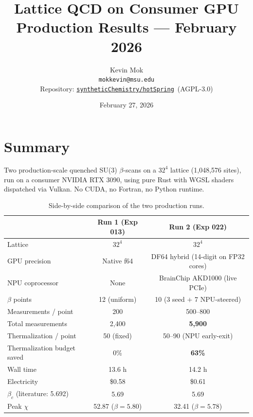 \documentclass[11pt,a4paper]{article}
\newcommand{\schi}{\chi}
\newcommand{\btc}{\beta_c}
\newcommand{\repo}{\href{https://github.com/syntheticChemistry/hotSpring}%
                        {\texttt{syntheticChemistry/hotSpring}}}
\begin{document}
\title{\textbf{Lattice QCD on Consumer GPU}\\[4pt]
       \large Production Results --- February 2026}
\author{Kevin Mok\\
        \small\texttt{mokkevin@msu.edu}\\[4pt]
        \small Repository: \repo\ (AGPL-3.0)}
\date{February 27, 2026}
\maketitle
\tableofcontents
\newpage

\section*{Summary}

Two production-scale quenched SU(3) $\beta$-scans on a $32^4$ lattice
(1,048,576 sites), run on a consumer NVIDIA RTX 3090, using pure Rust with
WGSL shaders dispatched via Vulkan.  No CUDA, no Fortran, no Python runtime.

\begin{table}[H]
\centering
\caption{Side-by-side comparison of the two production runs.}
\label{tab:summary}
\renewcommand{\arraystretch}{1.3}
\begin{tabular}{lcc}
\toprule
 & \textbf{Run 1 (Exp 013)} & \textbf{Run 2 (Exp 022)} \\
\midrule
Lattice                      & $32^4$       & $32^4$ \\
GPU precision                & Native f64   & DF64 hybrid (14-digit on FP32 cores) \\
NPU coprocessor              & None         & BrainChip AKD1000 (live PCIe) \\
$\beta$ points               & 12 (uniform) & 10 (3 seed $+$ 7 NPU-steered) \\
Measurements / point         & 200          & 500--800 \\
Total measurements           & 2,400        & \textbf{5,900} \\
Thermalization / point       & 50 (fixed)   & 50--90 (NPU early-exit) \\
Thermalization budget saved  & 0\%          & \textbf{63\%} \\
Wall time                    & 13.6 h       & 14.2 h \\
Electricity                  & \$0.58       & \$0.61 \\
$\btc$ (literature: 5.692)   & 5.69         & 5.69 \\
Peak $\schi$                 & 52.87 ($\beta=5.80$) & 32.41 ($\beta=5.78$) \\
\bottomrule
\end{tabular}
\end{table}
\end{document}
